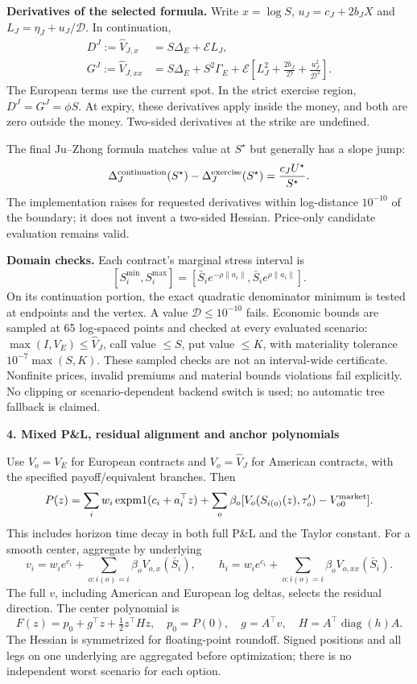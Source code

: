\documentclass[11pt,a4paper]{article}
\newcommand{\diag}{\operatorname{diag}}
\begin{document}
\textbf{Derivatives of the selected formula.}
Write $x=\log S$, $u_J=c_J+2b_JX$ and
$L_J=\eta_J+u_J/\mathcal D$. In continuation,
\begin{align*}
 D^J:=\widehat V_{J,x}
 &=S\Delta_E+\mathcal E L_J,\\
 G^J:=\widehat V_{J,xx}
 &=S\Delta_E+S^2\Gamma_E+
 \mathcal E\left[L_J^2+\frac{2b_J}{\mathcal D}
                      +\frac{u_J^2}{\mathcal D^2}\right].
\end{align*}
The European terms use the current spot. In the strict exercise region,
$D^J=G^J=\phi S$. At expiry, these derivatives apply inside the money, and both
are zero outside the money. Two-sided derivatives at the strike are undefined.

The final Ju--Zhong formula matches value at $S^\star$ but generally has a slope
jump:
\[
 \Delta_J^{\rm continuation}(S^\star)
 -\Delta_J^{\rm exercise}(S^\star)=\frac{c_JU^\star}{S^\star}.
\]
The implementation raises for requested derivatives within log-distance
$10^{-10}$ of the boundary; it does not invent a two-sided Hessian.
Price-only candidate evaluation remains valid.

\textbf{Domain checks.}
Each contract's marginal stress interval is
\[
 [S_i^{\min},S_i^{\max}]=
 [\bar S_i e^{-\rho\|a_i\|},\bar S_i e^{\rho\|a_i\|}].
\]
On its continuation portion, the exact quadratic denominator minimum is tested
at endpoints and the vertex. A value $\mathcal D\leq10^{-10}$ fails. Economic
bounds are sampled at 65 log-spaced points and checked at every evaluated
scenario: $\max(I,V_E)\leq\widehat V_J$, call value $\leq S$, put value $\leq K$,
with materiality tolerance $10^{-7}\max(S,K)$. These sampled checks are not an
interval-wide certificate. Nonfinite prices, invalid premiums and material
bounds violations fail explicitly. No clipping or scenario-dependent backend
switch is used; no automatic tree fallback is claimed.

\newpage
\textbf{4. Mixed P\&L, residual alignment and anchor polynomials}

Use $V_o=V_E$ for European contracts and $V_o=\widehat V_J$ for American
contracts, with the specified payoff/equivalent branches. Then
\[
 P(z)=\sum_i w_i\operatorname{expm1}(c_i+a_i^\top z)
 +\sum_o\beta_o[V_o(S_{i(o)}(z),\tau'_o)-V_{o0}^{\rm market}].
\]
This includes horizon time decay in both full P\&L and the Taylor constant.
For a smooth center, aggregate by underlying
\[
 v_i=w_i e^{c_i}+\sum_{o:i(o)=i}\beta_o V_{o,x}(\bar S_i),\qquad
 h_i=w_i e^{c_i}+\sum_{o:i(o)=i}\beta_o V_{o,xx}(\bar S_i).
\]
The full $v$, including American and European log deltas, selects the residual
direction. The center polynomial is
\[
 F(z)=p_0+g^\top z+\tfrac12z^\top Hz,\quad
 p_0=P(0),\quad g=A^\top v,\quad H=A^\top\diag(h)A.
\]
The Hessian is symmetrized for floating-point roundoff. Signed positions and
all legs on one underlying are aggregated before optimization; there is no
independent worst scenario for each option.
\end{document}
